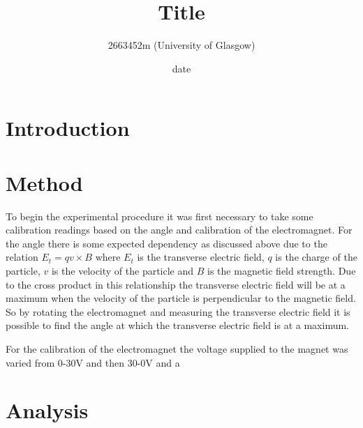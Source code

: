 \documentclass[]{article}
\title{\textbf{Title}}
\author{2663452m (University of Glasgow)}
\date{date}
\begin{document}
\maketitle

\begin{abstract}
\end{abstract}
\newpage





\section*{Introduction}





\section*{Method}
To begin the experimental procedure it was first necessary to take some calibration readings based on the angle and calibration of the electromagnet.
For the angle there is some expected dependency as discussed above due to the relation $E_t = qv \times B$ where $E_t$ is the transverse electric field, $q$ is the charge of the particle, $v$ is the velocity of the particle and $B$ is the magnetic field strength.
Due to the cross product in this relationship the transverse electric field will be at a maximum when the velocity of the particle is perpendicular to the magnetic field. So by rotating the electromagnet and measuring the transverse electric field it is possible to find the angle at which the transverse electric field is at a maximum.

For the calibration of the electromagnet the voltage supplied to the magnet was varied from 0-30V and then 30-0V and a 



\section*{Analysis}




\newpage
\end{document}
